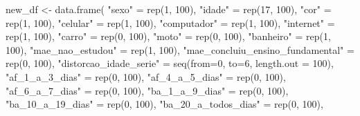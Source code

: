 \documentclass[
]{article}
\newenvironment{Shaded}{\begin{snugshade}}{\end{snugshade}}
\newcommand{\AttributeTok}[1]{\textcolor[rgb]{0.40,0.45,0.13}{#1}}
\newcommand{\DecValTok}[1]{\textcolor[rgb]{0.68,0.00,0.00}{#1}}
\newcommand{\FunctionTok}[1]{\textcolor[rgb]{0.28,0.35,0.67}{#1}}
\newcommand{\NormalTok}[1]{\textcolor[rgb]{0.00,0.23,0.31}{#1}}
\newcommand{\OtherTok}[1]{\textcolor[rgb]{0.00,0.23,0.31}{#1}}
\newcommand{\StringTok}[1]{\textcolor[rgb]{0.13,0.47,0.30}{#1}}
\begin{document}
\begin{Shaded}
\begin{Highlighting}[]
\NormalTok{new\_df }\OtherTok{\textless{}{-}} \FunctionTok{data.frame}\NormalTok{(}
  \StringTok{"sexo"} \OtherTok{=} \FunctionTok{rep}\NormalTok{(}\DecValTok{1}\NormalTok{, }\DecValTok{100}\NormalTok{),}
  \StringTok{"idade"} \OtherTok{=} \FunctionTok{rep}\NormalTok{(}\DecValTok{17}\NormalTok{, }\DecValTok{100}\NormalTok{),}
  \StringTok{"cor"} \OtherTok{=} \FunctionTok{rep}\NormalTok{(}\DecValTok{1}\NormalTok{, }\DecValTok{100}\NormalTok{),}
  \StringTok{"celular"} \OtherTok{=} \FunctionTok{rep}\NormalTok{(}\DecValTok{1}\NormalTok{, }\DecValTok{100}\NormalTok{),}
  \StringTok{"computador"} \OtherTok{=} \FunctionTok{rep}\NormalTok{(}\DecValTok{1}\NormalTok{, }\DecValTok{100}\NormalTok{),}
  \StringTok{"internet"} \OtherTok{=} \FunctionTok{rep}\NormalTok{(}\DecValTok{1}\NormalTok{, }\DecValTok{100}\NormalTok{),}
  \StringTok{"carro"} \OtherTok{=} \FunctionTok{rep}\NormalTok{(}\DecValTok{0}\NormalTok{, }\DecValTok{100}\NormalTok{),}
  \StringTok{"moto"} \OtherTok{=} \FunctionTok{rep}\NormalTok{(}\DecValTok{0}\NormalTok{, }\DecValTok{100}\NormalTok{),}
  \StringTok{"banheiro"} \OtherTok{=} \FunctionTok{rep}\NormalTok{(}\DecValTok{1}\NormalTok{, }\DecValTok{100}\NormalTok{),}
  \StringTok{"mae\_nao\_estudou"} \OtherTok{=} \FunctionTok{rep}\NormalTok{(}\DecValTok{1}\NormalTok{, }\DecValTok{100}\NormalTok{),}
  \StringTok{"mae\_concluiu\_ensino\_fundamental"} \OtherTok{=} \FunctionTok{rep}\NormalTok{(}\DecValTok{0}\NormalTok{, }\DecValTok{100}\NormalTok{),}
  \StringTok{"distorcao\_idade\_serie"} \OtherTok{=} \FunctionTok{seq}\NormalTok{(}\AttributeTok{from=}\DecValTok{0}\NormalTok{, }\AttributeTok{to=}\DecValTok{6}\NormalTok{, }\AttributeTok{length.out =} \DecValTok{100}\NormalTok{),}
  \StringTok{"af\_1\_a\_3\_dias"} \OtherTok{=} \FunctionTok{rep}\NormalTok{(}\DecValTok{0}\NormalTok{, }\DecValTok{100}\NormalTok{),}
  \StringTok{"af\_4\_a\_5\_dias"} \OtherTok{=} \FunctionTok{rep}\NormalTok{(}\DecValTok{0}\NormalTok{, }\DecValTok{100}\NormalTok{),}
  \StringTok{"af\_6\_a\_7\_dias"} \OtherTok{=} \FunctionTok{rep}\NormalTok{(}\DecValTok{0}\NormalTok{, }\DecValTok{100}\NormalTok{),}
  \StringTok{"ba\_1\_a\_9\_dias"} \OtherTok{=} \FunctionTok{rep}\NormalTok{(}\DecValTok{0}\NormalTok{, }\DecValTok{100}\NormalTok{),}
  \StringTok{"ba\_10\_a\_19\_dias"} \OtherTok{=} \FunctionTok{rep}\NormalTok{(}\DecValTok{0}\NormalTok{, }\DecValTok{100}\NormalTok{),}
  \StringTok{"ba\_20\_a\_todos\_dias"} \OtherTok{=} \FunctionTok{rep}\NormalTok{(}\DecValTok{0}\NormalTok{, }\DecValTok{100}\NormalTok{),}

\end{Highlighting}
\end{Shaded}
\end{document}
